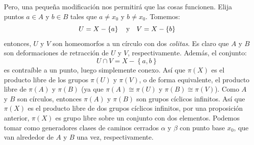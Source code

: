 \documentclass[12pt]{report}
\newcounter{it}
\theoremstyle{largebreak}
\begin{document}
\begin{exa}
        Pero, una pequeña modificación nos permitirá que las cosas funcionen. Elija puntos $a\in A$ y $b\in B$ tales que $a\neq x_0$ y $b\neq x_0$. Tomemos:
        \begin{equation*}
            U=X-\left\{ a\right\}\quad\textup{y}\quad V=X-\left\{b\right\}
        \end{equation*}
        entonces, $U$ y $V$ son homeomorfos a un círculo con dos \textit{colitas}. Es claro que $A$ y $B$ son deformaciones de retracción de $U$ y $V$, respectivamente. Además, el conjunto:
        \begin{equation*}
            U\cap V=X-\left\{a,b \right\}
        \end{equation*}
        es contraíble a un punto, luego simplemente conexo. Así que $\pi(X)$ es el producto libre de los grupos $\pi(U)$ y $\pi(V)$, o de forma equivalente, el producto libre de $\pi(A)$ y $\pi(B)$ (ya que $\pi(A)\cong\pi(U)$ y $\pi(B)\cong\pi(V)$). Como $A$ y $B$ son círculos, entonces $\pi(A)$ y $\pi(B)$ son grupos cíclicos infinitos. Así que $\pi(X)$ es el producto libre de dos grupos cíclicos infinitos, por una proposición anterior, $\pi(X)$ es grupo libre sobre un conjunto con dos elementos. Podemos tomar como generadores clases de caminos cerrados $\alpha$ y $\beta$ con punto base $x_0$, que van alrededor de $A$ y $B$ una vez, respectivamente.
    \end{exa}
\end{document}
